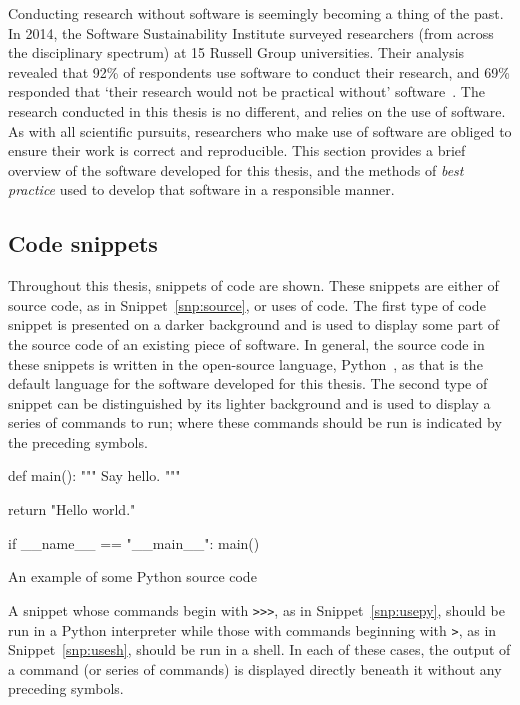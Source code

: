 Conducting research without software is seemingly becoming a thing of the past.
In 2014, the Software Sustainability Institute surveyed researchers (from across
the disciplinary spectrum) at 15 Russell Group universities. Their analysis
revealed that 92\% of respondents use software to conduct their research, and
69\% responded that `their research would not be practical without'
software~\cite{Hettrick2014}. The research conducted in this thesis is no
different, and relies on the use of software. As with all scientific pursuits,
researchers who make use of software are obliged to ensure their work is correct
and reproducible. This section provides a brief overview of the software
developed for this thesis, and the methods of \emph{best practice} used to
develop that software in a responsible manner.

\subsection{Code snippets}

Throughout this thesis, snippets of code are shown. These snippets are either of
source code, as in Snippet~\ref{snp:source}, or uses of code. The first type of
code snippet is presented on a darker background and is used to display some
part of the source code of an existing piece of software. In general, the source
code in these snippets is written in the open-source language,
Python~\cite{python}, as that is the default language for the software developed
for this thesis. The second type of snippet can be distinguished by its lighter
background and is used to display a series of commands to run; where these
commands should be run is indicated by the preceding symbols.

\begin{listing}[htbp]
\begin{sourcepy}
def main():
    """ Say hello. """

    return "Hello world."

if __name__ == "__main__":
    main()
\end{sourcepy}
\caption{An example of some Python source code}\label{snp:source}
\end{listing}

A snippet whose commands begin with \texttt{>>>}, as in
Snippet~\ref{snp:usepy}, should be run in a Python interpreter while those with
commands beginning with \texttt{>}, as in Snippet~\ref{snp:usesh},
should be run in a shell. In each of these cases, the output of a command (or
series of commands) is displayed directly beneath it without any preceding
symbols.

